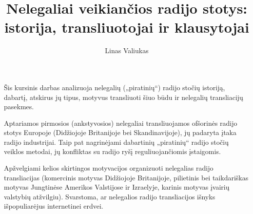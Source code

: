 \documentclass[kursinis-darbas]{vukf}
\begin{document}
	
\title{Nelegaliai veikiančios radijo stotys: istorija, transliuotojai ir klausytojai}
\author{Linas Valiukas}

\maketitle
\tableofcontents


\begin{vukfAbstract}
	

Šis kursinis darbas analizuoja nelegalių („piratinių“) radijo stočių istoriją, dabartį, atskirus jų tipus, motyvus transliuoti šiuo būdu ir nelegalių transliacijų pasekmes.

Aptariamos pirmosios (ankstyvosios) nelegaliai transliuojamos ofšorinės radijo stotys Europoje (Didžiojoje Britanijoje bei Skandinavijoje), jų padaryta įtaka radijo industrijai. Taip pat nagrinėjami dabartinių „piratinių“ radijo stočių veiklos metodai, jų konfliktas su radijo ryšį reguliuojančiomis įstaigomis.

Apžvelgiami kelios skirtingos motyvacijos organizuoti nelegalias radijo transliacijas (komercinis motyvas Didžiojoje Britanijoje, pilietinis bei taikdariškas motyvas Jungtinėse Amerikos Valstijose ir Izraelyje, karinis motyvas įvairių valstybių atžvilgiu). Svarstoma, ar nelegalios radijo transliacijos išnyks išpopuliarėjus internetinei erdvei.

\end{vukfAbstract}
\end{document}
